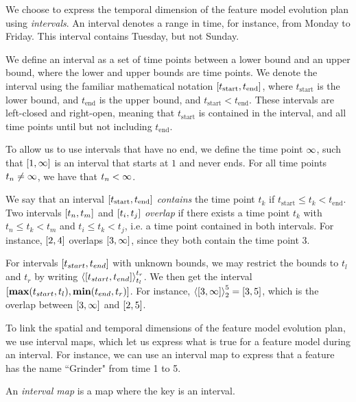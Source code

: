 We choose to express the temporal dimension of the feature model evolution plan using \emph{intervals}. An interval denotes a range in time, for instance, from Monday to Friday. This interval contains Tuesday, but not Sunday.
\begin{definition}[Interval]
  We define an interval as a set of time points between a lower bound and an upper bound, where the lower and upper bounds are time points. We denote the interval using the familiar mathematical notation $\interval{t_\text{start}}{t_\text{end}}$, where $t_\text{start}$ is the lower bound, and $t_\text{end}$ is the upper bound, and $t_\text{start} < t_\text{end}$. These intervals are left-closed and right-open, meaning that $t_\text{start}$ is contained in the interval, and all time points until but not including $t_\text{end}$.
  \label{def:interval}
\end{definition}

To allow us to use intervals that have no end, we define the time point $\infty$, such that $\interval{1}{\forever}$ is an interval that starts at $1$ and never ends. For all time points $t_n \neq \infty$, we have that $t_n < \infty$. 

We say that an interval $\interval{t_\text{start}}{t_\text{end}}$ \emph{contains} the time point $t_k$ if $t_\text{start} \leq t_k < t_\text{end}$. Two intervals $\interval{t_n}{t_m}$ and $\interval{t_i}{t_j}$ \emph{overlap} if there exists a time point $t_k$ with $t_n \leq t_k < t_m$ and $t_i \leq t_k < t_j$, i.e. a time point contained in both intervals. For instance, $\interval{2}{4}$ overlaps $\interval{3}{\forever}$, since they both contain the time point 3.

For intervals $\interval{t_{start}}{t_{end}}$ with unknown bounds, we may restrict the bounds to $t_l$ and $t_r$ by writing $\clamp{\interval{t_{start}}{t_{end}}}{t_l}{t_r}$. We then get the interval $\interval{\textbf{max}(t_{start}, t_l)}{\textbf{min}(t_{end}, t_r)}$. For instance, $\clamp{\interval{3}{\forever}}{2}{5} = \interval{3}{5}$, which is the overlap between $\interval{3}{\forever}$ and $\interval{2}{5}$.


To link the spatial and temporal dimensions of the feature model evolution plan, we use interval maps, which let us express what is true for a feature model during an interval. For instance, we can use an interval map to express that a feature has the name ``Grinder" from time 1 to 5.
\\

\begin{definition}
An \emph{interval map} is a map where the key is an interval. 
  \label{def:interval-map}
\end{definition}

